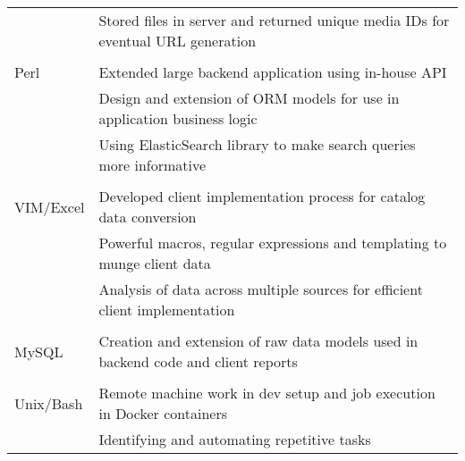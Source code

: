 \documentclass[12pt]{article}
\begin{document}
\begin{description}
\begin{description}
\begin{tabular}{l|l}
                                   & Stored files in server and returned unique media IDs for eventual URL generation\\
                                     \\
                        Perl   & Extended large backend application using in-house API \\
                                   & Design and extension of ORM models for use in application business logic \\
                                   & Using ElasticSearch library to make search queries more informative\\
                                     \\
                        VIM/Excel  & Developed client implementation process for catalog data conversion\\
                                   & Powerful macros, regular expressions and templating to munge client data\\
                                   & Analysis of data across multiple sources for efficient client implementation\\
                                     \\
                        MySQL      & Creation and extension of raw data models used in backend code and client reports\\
                                     \\
                        Unix/Bash  & Remote machine work in dev setup and job execution in Docker containers\\
                                   & Identifying and automating repetitive tasks
                    \end{tabular}


\end{description}
\end{description}
\end{document}

